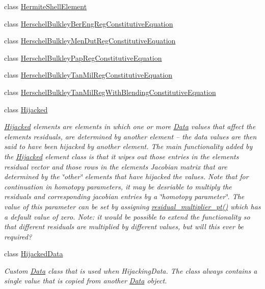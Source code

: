 \begin{DoxyCompactItemize}
class \hyperlink{classoomph_1_1HermiteShellElement}{Hermite\+Shell\+Element}
\item 
class \hyperlink{classoomph_1_1HerschelBulkleyBerEngRegConstitutiveEquation}{Herschel\+Bulkley\+Ber\+Eng\+Reg\+Constitutive\+Equation}
\item 
class \hyperlink{classoomph_1_1HerschelBulkleyMenDutRegConstitutiveEquation}{Herschel\+Bulkley\+Men\+Dut\+Reg\+Constitutive\+Equation}
\item 
class \hyperlink{classoomph_1_1HerschelBulkleyPapRegConstitutiveEquation}{Herschel\+Bulkley\+Pap\+Reg\+Constitutive\+Equation}
\item 
class \hyperlink{classoomph_1_1HerschelBulkleyTanMilRegConstitutiveEquation}{Herschel\+Bulkley\+Tan\+Mil\+Reg\+Constitutive\+Equation}
\item 
class \hyperlink{classoomph_1_1HerschelBulkleyTanMilRegWithBlendingConstitutiveEquation}{Herschel\+Bulkley\+Tan\+Mil\+Reg\+With\+Blending\+Constitutive\+Equation}
\item 
class \hyperlink{classoomph_1_1Hijacked}{Hijacked}
\begin{DoxyCompactList}\small\item\em \hyperlink{classoomph_1_1Hijacked}{Hijacked} elements are elements in which one or more \hyperlink{classoomph_1_1Data}{Data} values that affect the element\textquotesingle{}s residuals, are determined by another element -- the data values are then said to have been hijacked by another element. The main functionality added by the \hyperlink{classoomph_1_1Hijacked}{Hijacked} element class is that it wipes out those entries in the element\textquotesingle{}s residual vector and those rows in the element\textquotesingle{}s Jacobian matrix that are determined by the \char`\"{}other\char`\"{} elements that have hijacked the values. Note that for continuation in homotopy parameters, it may be desriable to multiply the residuals and corresponding jacobian entries by a \char`\"{}homotopy parameter\char`\"{}. The value of this parameter can be set by assigning \hyperlink{classoomph_1_1HijackedElementBase_affdb1888fb6b2de051bc0345e6f5d934}{residual\+\_\+multiplier\+\_\+pt()} which has a default value of zero. Note\+: it would be possible to extend the functionality so that different residuals are multiplied by different values, but will this ever be required? \end{DoxyCompactList}\item 
class \hyperlink{classoomph_1_1HijackedData}{Hijacked\+Data}
\begin{DoxyCompactList}\small\item\em Custom \hyperlink{classoomph_1_1Data}{Data} class that is used when Hijacking\+Data. The class always contains a single value that is copied from another \hyperlink{classoomph_1_1Data}{Data} object. \end{DoxyCompactList}\item 

\end{DoxyCompactItemize}

